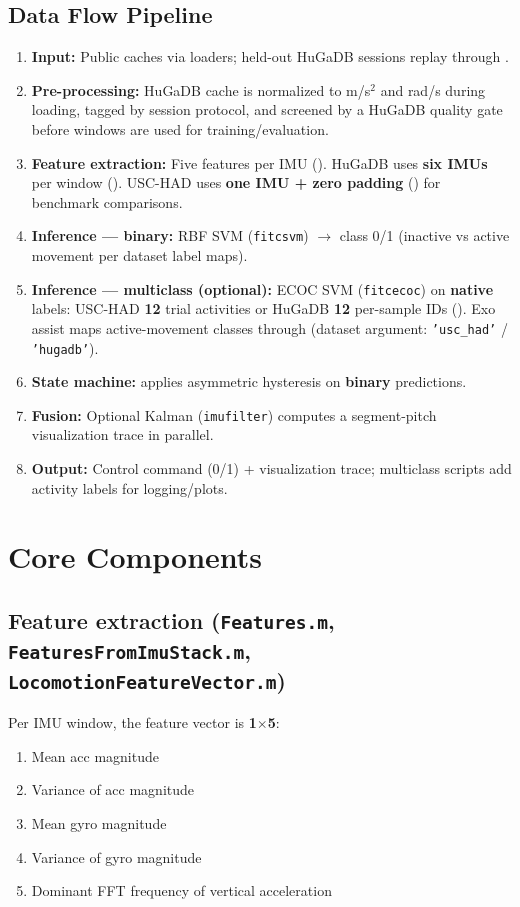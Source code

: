 \documentclass[11pt,a4paper]{article}
\begin{document}
\subsection{Data Flow Pipeline}
\begin{enumerate}
  \item \textbf{Input:} Public  caches via loaders; held-out HuGaDB sessions replay through .
  \item \textbf{Pre-processing:} HuGaDB cache is normalized to m/s$^2$ and rad/s during loading, tagged by session protocol, and screened by a HuGaDB quality gate before windows are used for training/evaluation.
  \item \textbf{Feature extraction:} Five features per IMU (). HuGaDB uses \textbf{six IMUs} per window (). USC-HAD uses \textbf{one IMU + zero padding} () for benchmark comparisons.
  \item \textbf{Inference --- binary:} RBF SVM (\texttt{fitcsvm}) $\rightarrow$ class 0/1 (inactive vs active movement per dataset label maps).
  \item \textbf{Inference --- multiclass (optional):} ECOC SVM (\texttt{fitcecoc}) on \textbf{native} labels: USC-HAD \textbf{12} trial activities or HuGaDB \textbf{12} per-sample IDs (). Exo assist maps active-movement classes through  (dataset argument: \texttt{'usc\_had'} / \texttt{'hugadb'}).
  \item \textbf{State machine:}  applies asymmetric hysteresis on \textbf{binary} predictions.
  \item \textbf{Fusion:} Optional Kalman (\texttt{imufilter}) computes a segment-pitch visualization trace in parallel.
  \item \textbf{Output:} Control command (0/1) + visualization trace; multiclass scripts add activity labels for logging/plots.
\end{enumerate}

\section{Core Components}

\subsection{Feature extraction (\texttt{Features.m}, \texttt{FeaturesFromImuStack.m}, \texttt{LocomotionFeatureVector.m})}
Per IMU window, the feature vector is \textbf{1$\times$5}:
\begin{enumerate}
  \item Mean acc magnitude
  \item Variance of acc magnitude
  \item Mean gyro magnitude
  \item Variance of gyro magnitude
  \item Dominant FFT frequency of vertical acceleration
\end{enumerate}
\end{document}
